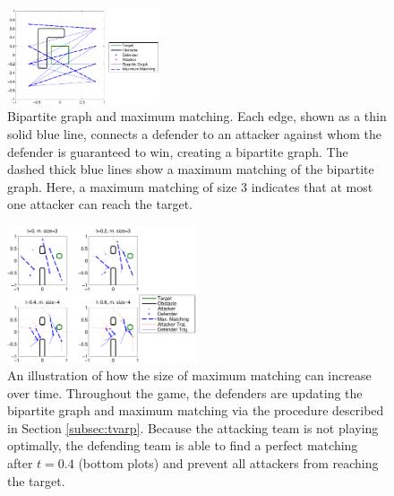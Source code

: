 \begin{figure}
	\centering
	\includegraphics[width=0.4\textwidth]{"fig/max matching 2"}
	\caption{Bipartite graph and maximum matching. Each edge, shown as a thin solid blue line, connects a defender to an attacker against whom the defender is guaranteed to win, creating a bipartite graph. The dashed thick blue lines show a maximum matching of the bipartite graph. Here, a maximum matching of size 3 indicates that at most one attacker can reach the target.}
	\label{fig:max_matching_2}

\end{figure}

\begin{figure}[h]
\centering
\includegraphics[width=0.5\textwidth]{"fig/time varying graph"}
\caption{An illustration of how the size of maximum matching can increase over time. Throughout the game, the defenders are updating the bipartite graph and maximum matching via the procedure described in Section \ref{subsec:tvarp}. Because the attacking team is not playing optimally, the defending team is able to find a perfect matching after $t=0.4$ (bottom plots) and prevent all attackers from reaching the target.}
\label{fig:tvarg}
\end{figure}